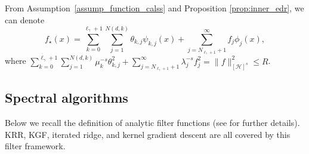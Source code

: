 \documentclass{article}
\theoremstyle{plain}
\theoremstyle{definition}
\theoremstyle{remark}
\newcommand{\calH}{\mathcal{H}}
\begin{document}

From Assumption~\ref{assump_function_calss} and Proposition \ref{prop:inner_edr}, we can denote 
\begin{equation}\label{eqn_decompose_reg_func}
    f_{\star}(x) = \sum_{k=0}^{\ell_{\gamma}+1} \sum_{j=1}^{N(d,k)} \theta_{k,j} \psi_{k,j}(x) + \sum_{j =N_{\ell_{\gamma}+1}+1}^{\infty} f_j \phi_{j}(x),
\end{equation}
where $\sum_{k=0}^{\ell_{\gamma}+1} \sum_{j=1}^{N(d,k)} \mu_k^{-s} \theta_{k,j}^2+ \sum\nolimits_{j=N_{\ell_{\gamma}+1}+1}^{\infty} \lambda_j^{-s} f_j^2 = \|f\|_{[\calH]^{s}}^2 \leq R$.
















\subsection{Spectral algorithms}

Below we recall the definition of analytic filter functions (see \cite{bauer2007_RegularizationAlgorithms, li2024generalization, lu2024saturation} for further details).
KRR, KGF, iterated ridge, and kernel gradient descent are all covered by this filter framework. 
\end{document}
